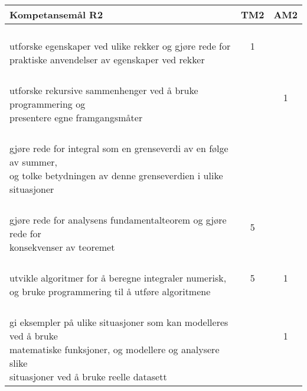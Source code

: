 \documentclass{article}
\begin{document}
\begin{center}
\begin{tabular}{p{10.5cm} | c | c |} 
	\textbf{Kompetansemål R2} &	\textbf{TM2} &\textbf{AM2} \\ \hline
	\shortstack[l]{\\ utforske egenskaper ved ulike rekker og gjøre rede for \\ praktiske anvendelser av egenskaper ved rekker
	} &\shortstack{1\\{}} &\\ \hline
	
	
	\shortstack[l]{\\ utforske rekursive sammenhenger ved å bruke programmering og\\ presentere egne framgangsmåter
	} &\shortstack{} &\shortstack{1\\{}} \\ \hline
	
	\shortstack[l]{\\gjøre rede for integral som en grenseverdi av en følge av summer,\\ og tolke betydningen av denne grenseverdien i ulike situasjoner
	} &\shortstack{5} &\shortstack{} \\ \hline
	
	\shortstack[l]{\\ gjøre rede for analysens fundamentalteorem og gjøre rede for\\ konsekvenser av teoremet
	} &\shortstack{5\\{}} &\shortstack{} \\ \hline
	
	\shortstack[l]{\\ utvikle algoritmer for å beregne integraler numerisk, \\og bruke programmering til å utføre algoritmene
	} &\shortstack{5\\{}} &\shortstack{1\\{}} \\ \hline
	
	\shortstack[l]{\\ gi eksempler på ulike situasjoner som kan modelleres ved å bruke \\ matematiske funksjoner, og modellere og analysere slike \\ situasjoner ved å bruke reelle datasett
	} &\shortstack{ \\{} \\{}} &\shortstack{1\\{}\\{}} \\ \hline
	

\end{tabular}
\end{center}
\end{document}
